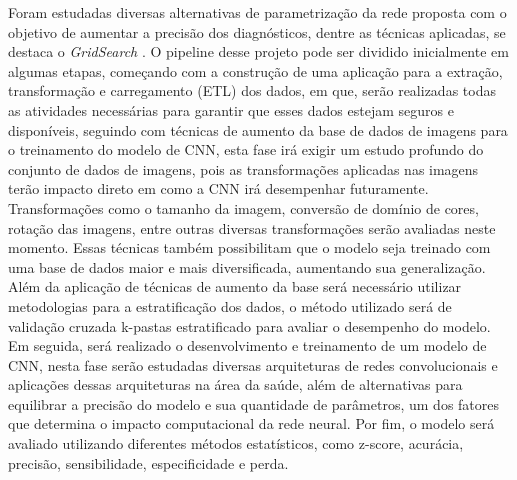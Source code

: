 Foram estudadas diversas alternativas de parametrização da rede proposta com o objetivo de aumentar a precisão dos diagnósticos, dentre as técnicas aplicadas, se destaca o \textit{GridSearch} . O pipeline desse projeto pode ser dividido inicialmente em algumas etapas, começando com a construção de uma aplicação para a extração, transformação e carregamento (\acs{ETL}) dos dados, em que, serão realizadas todas as atividades necessárias para garantir que esses dados estejam seguros e disponíveis, seguindo com técnicas de aumento da base de dados de imagens para o treinamento do modelo de \acs{CNN}, esta fase irá exigir um estudo profundo do conjunto de dados de imagens, pois as transformações aplicadas nas imagens terão impacto direto em como a \acs{CNN} irá desempenhar futuramente. Transformações como o tamanho da imagem, conversão de domínio de cores, rotação das imagens, entre outras diversas transformações serão avaliadas neste momento. Essas técnicas também possibilitam que o modelo seja treinado com uma base de dados maior e mais diversificada, aumentando sua generalização. Além da aplicação de técnicas de aumento da base será necessário utilizar metodologias para a estratificação dos dados, o método utilizado será de validação cruzada k-pastas estratificado para avaliar o desempenho do modelo. Em seguida, será realizado o desenvolvimento e treinamento de um modelo de \acs{CNN}, nesta fase serão estudadas diversas arquiteturas de redes convolucionais e aplicações dessas arquiteturas na área da saúde, além de alternativas para equilibrar a precisão do modelo e sua quantidade de parâmetros, um dos fatores que determina o impacto computacional da rede neural. Por fim, o modelo será avaliado utilizando diferentes métodos estatísticos, como z-score, acurácia, precisão, sensibilidade, especificidade e perda.


